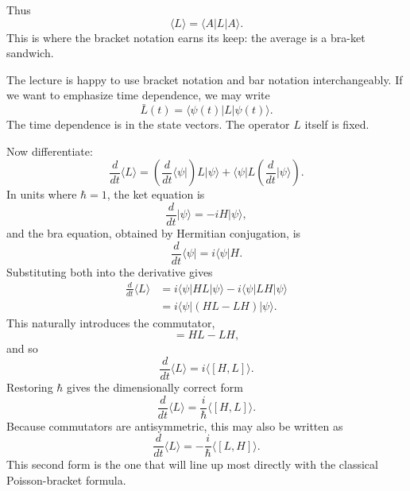 Thus
\begin{equation}
\langle L\rangle=\langle A|L|A\rangle.
\end{equation}
This is where the bracket notation earns its keep: the average is a bra-ket sandwich.

The lecture is happy to use bracket notation and bar notation interchangeably. If we want to emphasize time dependence, we may write
\begin{equation}
\bar L(t)=\langle \psi(t)|L|\psi(t)\rangle.
\end{equation}
The time dependence is in the state vectors. The operator \(L\) itself is fixed.

Now differentiate:
\begin{equation}
\frac{d}{dt}\langle L\rangle
=
\left(\frac{d}{dt}\langle \psi|\right)L|\psi\rangle
+
\langle \psi|L\left(\frac{d}{dt}|\psi\rangle\right).
\end{equation}
In units where \(\hbar=1\), the ket equation is
\begin{equation}
\frac{d}{dt}|\psi\rangle=-iH|\psi\rangle,
\end{equation}
and the bra equation, obtained by Hermitian conjugation, is
\begin{equation}
\frac{d}{dt}\langle \psi|=i\langle \psi|H.
\end{equation}
Substituting both into the derivative gives
\begin{align}
\frac{d}{dt}\langle L\rangle
&=
i\langle \psi|HL|\psi\rangle
-
i\langle \psi|LH|\psi\rangle \\
&=
i\langle \psi|(HL-LH)|\psi\rangle.
\end{align}
This naturally introduces the commutator,
\begin{equation}
[H,L]=HL-LH,
\end{equation}
and so
\begin{equation}
\frac{d}{dt}\langle L\rangle=i\langle [H,L]\rangle.
\end{equation}
Restoring \(\hbar\) gives the dimensionally correct form
\begin{equation}
\frac{d}{dt}\langle L\rangle=\frac{i}{\hbar}\langle [H,L]\rangle.
\end{equation}
Because commutators are antisymmetric, this may also be written as
\begin{equation}
\frac{d}{dt}\langle L\rangle=-\frac{i}{\hbar}\langle [L,H]\rangle.
\end{equation}
This second form is the one that will line up most directly with the classical Poisson-bracket formula.


